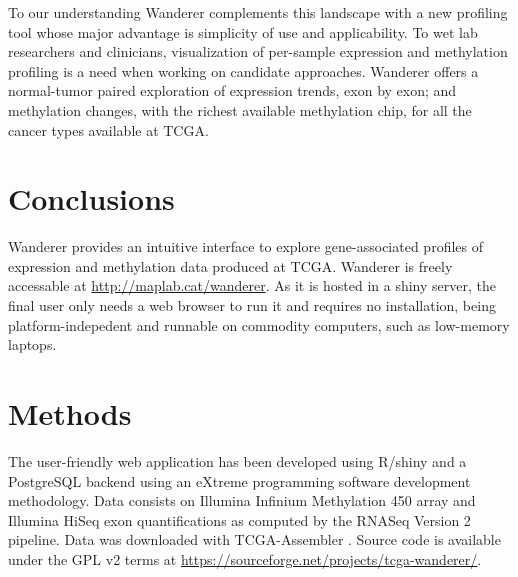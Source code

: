 \documentclass{bmcart}
\begin{document}
To our understanding Wanderer complements this landscape with a new profiling tool whose major advantage is simplicity of use and applicability. To wet lab researchers and clinicians, visualization of per-sample expression and methylation profiling is a need when working on candidate approaches. Wanderer offers a normal-tumor paired exploration of expression trends, exon by exon; and methylation changes, with the richest available methylation chip, for all the cancer types available at TCGA.

\section*{Conclusions}
Wanderer provides an intuitive interface to explore gene-associated profiles of expression and methylation data produced at TCGA. Wanderer is freely accessable at \url{http://maplab.cat/wanderer}. As it is hosted in a shiny server, the final user only needs a web browser to run it and requires no installation, being platform-indepedent and runnable on commodity computers, such as low-memory laptops.\\



\section*{Methods}

The user-friendly web application has been developed using R/shiny and a PostgreSQL backend using an eXtreme programming software development methodology. Data consists on Illumina Infinium Methylation 450 array and Illumina HiSeq exon quantifications as computed by the RNASeq Version 2 pipeline. Data was downloaded with TCGA-Assembler \cite{zhu2014tcga}. Source code is available under the GPL v2 terms at \url{https://sourceforge.net/projects/tcga-wanderer/}.









\end{document}
